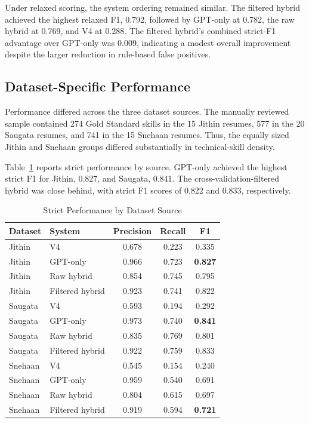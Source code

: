 \documentclass[conference]{IEEEtran}
\begin{document}
Under relaxed scoring, the system ordering remained similar. The filtered
hybrid achieved the highest relaxed F1, 0.792, followed by GPT-only at
0.782, the raw hybrid at 0.769, and V4 at 0.288. The filtered hybrid's
combined strict-F1 advantage over GPT-only was 0.009, indicating a modest
overall improvement despite the larger reduction in rule-based false
positives.

\subsection{Dataset-Specific Performance}

Performance differed across the three dataset sources. The manually
reviewed sample contained 274 Gold Standard skills in the 15 Jithin
resumes, 577 in the 20 Saugata resumes, and 741 in the 15 Snehaan
resumes. Thus, the equally sized Jithin and Snehaan groups differed
substantially in technical-skill density.

Table~\ref{tab:dataset_system_results} reports strict performance by
source. GPT-only achieved the highest strict F1 for Jithin, 0.827, and
Saugata, 0.841. The cross-validation-filtered hybrid was close behind,
with strict F1 scores of 0.822 and 0.833, respectively.

\begin{table}[t]
\caption{Strict Performance by Dataset Source}
\label{tab:dataset_system_results}
\centering
\scriptsize
\setlength{\tabcolsep}{3.0pt}
\begin{tabular}{llccc}
\toprule
Dataset & System & Precision & Recall & F1 \\
\midrule
Jithin & V4 & 0.678 & 0.223 & 0.335 \\
Jithin & GPT-only & 0.966 & 0.723 & \textbf{0.827} \\
Jithin & Raw hybrid & 0.854 & 0.745 & 0.795 \\
Jithin & Filtered hybrid & 0.923 & 0.741 & 0.822 \\
\midrule
Saugata & V4 & 0.593 & 0.194 & 0.292 \\
Saugata & GPT-only & 0.973 & 0.740 & \textbf{0.841} \\
Saugata & Raw hybrid & 0.835 & 0.769 & 0.801 \\
Saugata & Filtered hybrid & 0.922 & 0.759 & 0.833 \\
\midrule
Snehaan & V4 & 0.545 & 0.154 & 0.240 \\
Snehaan & GPT-only & 0.959 & 0.540 & 0.691 \\
Snehaan & Raw hybrid & 0.804 & 0.615 & 0.697 \\
Snehaan & Filtered hybrid & 0.919 & 0.594 & \textbf{0.721} \\
\bottomrule
\end{tabular}
\end{table}
\end{document}
